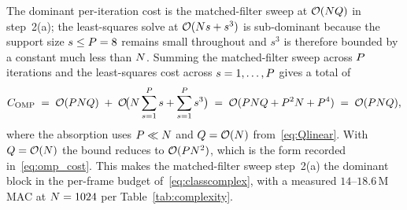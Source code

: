 The dominant per-iteration cost is the matched-filter sweep at $\mathcal{O}(N Q)$ in step~2(a); the least-squares solve at $\mathcal{O}(N s + s^3)$ is sub-dominant because the support size $s \leq P = 8$ remains small throughout and $s^3$ is therefore bounded by a constant much less than $N$. Summing the matched-filter sweep across $P$ iterations and the least-squares cost across $s = 1, \dots, P$ gives a total of
\begin{equation*}
C_\text{OMP} \;=\; \mathcal{O}(P N Q) \;+\; \mathcal{O}\!\bigl(N \sum_{s=1}^{P} s + \sum_{s=1}^{P} s^3\bigr) \;=\; \mathcal{O}(P N Q + P^2 N + P^4) \;=\; \mathcal{O}(P N Q),
\end{equation*}
where the absorption uses $P \ll N$ and $Q = \mathcal{O}(N)$ from~\eqref{eq:Qlinear}. With $Q = \mathcal{O}(N)$ the bound reduces to $\mathcal{O}(P N^2)$, which is the form recorded in~\eqref{eq:omp_cost}. This makes the matched-filter sweep step~2(a) the dominant block in the per-frame budget of~\eqref{eq:classcomplex}, with a measured $14$--$18.6$\,M MAC at $N = 1024$ per Table~\ref{tab:complexity}.
